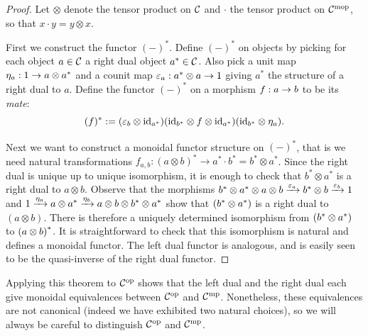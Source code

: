 \documentclass{amsart}
\begin{document}

\begin{proof}
Let $\otimes$ denote the tensor product on $\mathcal C$ and $\cdot$ the tensor product on $\mathcal C^{\mathrm{mop}}$, so that $x \cdot y = y \otimes x$.

First we construct the functor ${(-)^*}$.  Define ${(-)^*}$ on objects by picking for each object $a \in \mathcal C$ a right dual object ${a^*} \in \mathcal C$.  Also pick a unit map $\eta_a: 1 \rightarrow a \otimes {a^*}$ and a counit map  $\varepsilon_a: {a^*} \otimes a \rightarrow 1$  giving ${a^*}$ the structure of a right dual to $a$.  Define the functor ${(-)^*}$ on a morphism $f: a \rightarrow b$ to be its {\em mate}: 
\begin{equation*}
	{(f)^*} := (\varepsilon_b \otimes \mathrm{id}_{{a}^*}) (\mathrm{id}_{{b}^*} \otimes f \otimes \mathrm{id}_{{a}^*}) (\mathrm{id}_{{b}^*} \otimes \eta_a).
\end{equation*}

Next we want to construct a monoidal functor structure on $(-)^*$, that is we need natural transformations $f_{a,b}: (a \otimes b)^* \rightarrow a^* \cdot b^* = b^* \otimes a^*$.  Since the right dual is unique up to unique isomorphism, it is enough to check that $b^* \otimes a^*$ is a right dual to $a \otimes b$.  Observe that the morphisms ${b}^* \otimes {a}^* \otimes a \otimes b \xrightarrow{\varepsilon_a} {b}^* \otimes b \xrightarrow{\varepsilon_b} 1$ and $1 \xrightarrow{\eta_a} a \otimes {a}^* \xrightarrow{\eta_b} a \otimes b \otimes {b}^* \otimes {a}^*$ show that $({b}^* \otimes {a}^*)$ is a right dual to $(a \otimes b)$.  There is therefore a uniquely determined isomorphism from $({b}^* \otimes {a}^*)$ to ${(a \otimes b)}^*$.  It is straightforward to check that this isomorphism is natural and defines a monoidal functor.
The left dual functor is analogous, and is easily seen to be the quasi-inverse of the right dual functor. 
\end{proof}
\begin{remark}
Applying this theorem to $\mathcal C^{\mathrm{op}}$ shows that the left dual and the right dual each give monoidal equivalences between $\mathcal C^{\mathrm{op}}$ and $\mathcal C^{\mathrm{mp}}$.  Nonetheless, these equivalences are not canonical (indeed we have exhibited two natural choices), so we will always be careful to distinguish  $\mathcal C^{\mathrm{op}}$ and $\mathcal C^{\mathrm{mp}}$.
\end{remark}
\end{document}
